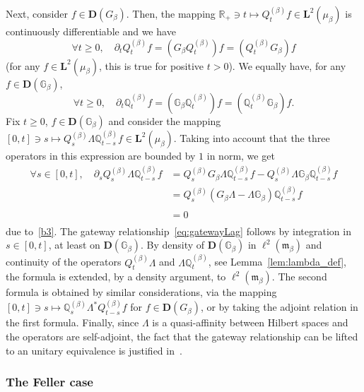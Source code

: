 \documentclass[10pt]{amsart}
\theoremstyle{definition}\newtheorem{defi}[theo]{Definition}\newtheorem{rema}[theo]{Remark}\newtheorem{exam}[theo]{Example}\newtheorem{exem}[theo]{Example}\newtheorem{nota}[theo]{Notation}
\newcommand{\RR}{\mathbb{R}}
\newcommand{\fm}{\mathfrak{m}}
\newcommand{\pa}{\partial}
\newcommand{\dBg}{{\discret{G}}}
\newcommand{\Bg}{G}
\newcommand{\dBs}{{\discret{Q}}}
\newcommand{\Bs}{Q}
\newcommand{\esD}{\mathbf{D}}
\newcommand{\esL}{\mathbf{L}}
\newcommand{\esLd}{\ell}
\newcommand{\discret}[1]{\mathds{#1}}
\let\oldforall\forall
\renewcommand*{\forall}{\mathrel{\oldforall}}
\begin{document}
Next, consider $f\in\esD(\Bg_{\beta})$. Then, the mapping $\RR_+\ni t\mapsto \Bs^{(\beta)}_t f \in\esL^2(\mu_{\beta})$ is continuously differentiable and we have
\[
\forall t\geq 0,\quad \pa_t \Bs^{(\beta)}_t f=(\Bg_{\beta}\Bs^{(\beta)}_t)f=(\Bs^{(\beta)}_t\Bg_{\beta}) f
\]
(for any $f\in\esL^2(\mu_{\beta})$, this is true for positive $t>0$). We equally have, for any $f\in \esD(\dBg_{\beta})$,
\[
\forall t\geq 0,\quad \pa_t \dBs^{(\beta)}_t f =(\dBg_{\beta}\dBs^{(\beta)}_t) f=(\dBs^{(\beta)}_t\dBg_{\beta}) f.
\]
Fix $t\geq 0$, $f\in \esD(\dBg_{\beta})$ and consider the mapping $[0,t]\ni s\mapsto \Bs^{(\beta)}_s\Lambda \dBs^{(\beta)}_{t-s}f\in\esL^2(\mu_{\beta})$. Taking into account that the three operators in this expression are bounded by $1$ in norm, we get
\begin{align*}
\forall s\in[0,t],\quad
\pa_s \Bs^{(\beta)}_s\Lambda \dBs^{(\beta)}_{t-s} f&=\Bs^{(\beta)}_s\Bg_{\beta}\Lambda \dBs^{(\beta)}_{t-s} f-\Bs^{(\beta)}_s\Lambda \dBg_{\beta}\dBs^{(\beta)}_{t-s} f \\
&=\Bs^{(\beta)}_s(\Bg_{\beta}\Lambda-\Lambda \dBg_{\beta}) \dBs^{(\beta)}_{t-s}f\\
&=0\phantom{\Bs^{(\beta)}_s}
\end{align*}
due to~\eqref{b3}. The gateway relationship~\eqref{eq:gatewayLag} follows by integration in $s\in[0,t]$, at least on $\esD(\dBg_{\beta})$. By density of $\esD(\dBg_{\beta})$ in $\esLd^2(\fm_{\beta})$ and continuity of the operators $\Bs^{(\beta)}_t\Lambda$ and $\Lambda \dBs^{(\beta)}_t$, see Lemma~\ref{lem:lambda_def}, the formula is extended, by a density argument, to $\esLd^2(\fm_{\beta})$. The second formula is obtained by similar considerations, via the mapping $[0,t]\ni s\mapsto \dBs^{(\beta)}_s\Lambda^* \Bs^{(\beta)}_{t-s}f$ for $f\in\esD(\Bg_{\beta})$, or by taking the adjoint relation in the first formula. Finally, since $\Lambda$ is a quasi-affinity between Hilbert spaces and the operators are self-adjoint, the fact that the gateway relationship can be lifted to an unitary equivalence is justified in~\cite[Lemma~4.1]{Douglas}.

\subsubsection{The Feller case}
\end{document}
